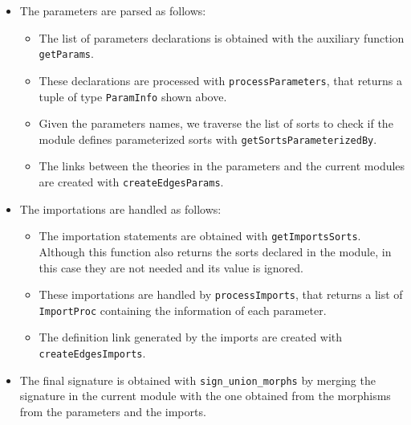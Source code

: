 \begin{itemize}
\item The parameters are parsed as follows:

\begin{itemize}
\item The list of parameters declarations is obtained with the auxiliary
function \verb"getParams".
\item These declarations are processed with \verb"processParameters",
that returns a tuple of type \verb"ParamInfo" shown above.
\item Given the parameters names, we traverse the list of sorts to check
if the module defines parameterized sorts with \verb"getSortsParameterizedBy".
\item The links between the theories in the parameters and the current modules
are created with \verb"createEdgesParams".
\end{itemize}

\item The importations are handled as follows:

\begin{itemize}
\item The importation statements are obtained with \verb"getImportsSorts".
Although this function also returns the sorts declared in the module, in
this case they are not needed and its value is ignored.
\item These importations are handled by \verb"processImports", that
returns a list of \verb"ImportProc" containing the information of each
parameter.
\item The definition link generated by the imports are created with
\verb"createEdgesImports".
\end{itemize}

\item The final signature is obtained with \verb"sign_union_morphs"
by merging the signature in the current module with the one obtained
from the morphisms from the parameters and the imports.

\end{itemize}

